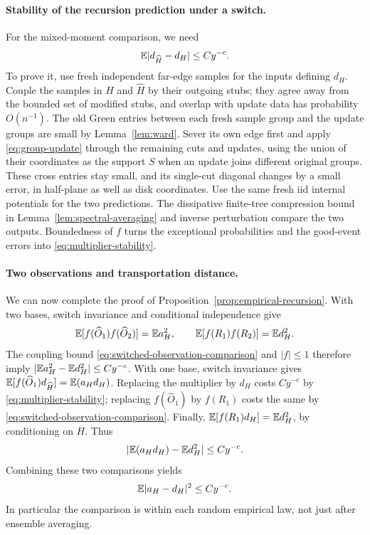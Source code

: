 \paragraph{Stability of the recursion prediction under a switch.}
For the mixed-moment comparison, we need
\begin{equation}\label{eq:multiplier-stability}
                       \mathbb E|d_{\widehat H}-d_H|\le Cy^{-c}.
\end{equation}
To prove it, use fresh independent far-edge samples for the inputs
defining $d_H$.  Couple the samples in $H$ and $\widehat H$ by their
outgoing stubs; they agree away from the bounded set of modified stubs,
and overlap with update data has probability $O(n^{-1})$.
The old Green entries between each fresh sample group and the update
groups are small by Lemma~\ref{lem:ward}.  Sever its own edge first
and apply \eqref{eq:group-update} through the remaining cuts and
updates, using the union of their coordinates as the support $S$
when an update joins different original groups.  These cross entries stay small, and its single-cut diagonal
changes by a small error, in half-plane as well as disk coordinates.
Use the same fresh iid internal potentials for the two predictions.
The dissipative finite-tree compression bound in
Lemma~\ref{lem:spectral-averaging} and inverse perturbation compare
the two outputs.  Boundedness of $f$ turns the exceptional probabilities
and the good-event errors into \eqref{eq:multiplier-stability}.

\paragraph{Two observations and transportation distance.}
We can now complete the proof of Proposition~\ref{prop:empirical-recursion}.
With two bases, switch invariance and conditional independence give
\[
 \mathbb E[f(\widehat O_1)f(\widehat O_2)]=\mathbb E a_H^2,
 \qquad
 \mathbb E[f(R_1)f(R_2)]=\mathbb E d_H^2.
\]
The coupling bound \eqref{eq:switched-observation-comparison} and
$|f|\le1$ therefore imply
$|\mathbb E a_H^2-\mathbb E d_H^2|\le Cy^{-c}$.
With one base, switch invariance gives
$\mathbb E[f(\widehat O_1)d_{\widehat H}]=\mathbb E(a_Hd_H)$.
Replacing the multiplier by $d_H$ costs $Cy^{-c}$ by
\eqref{eq:multiplier-stability}; replacing $f(\widehat O_1)$ by
$f(R_1)$ costs the same by
\eqref{eq:switched-observation-comparison}.  Finally,
$\mathbb E[f(R_1)d_H]=\mathbb E d_H^2$, by conditioning on $H$.  Thus
\[
                   |\mathbb E(a_Hd_H)-\mathbb E d_H^2|\le Cy^{-c}.
\]
Combining these two comparisons yields
\begin{equation}\label{eq:empirical-test-variance}
                         \mathbb E|a_H-d_H|^2\le Cy^{-c}.
\end{equation}
In particular the comparison is within each random empirical law,
not just after ensemble averaging.

